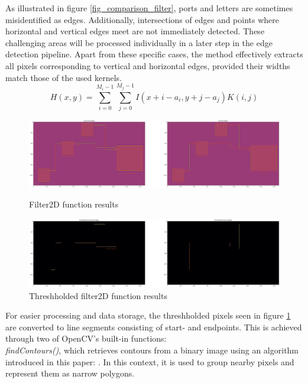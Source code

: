 As illustrated in figure \ref{fig_comparison_filter}, ports and letters are sometimes misidentified as edges. Additionally, intersections of edges and points where horizontal and vertical edges meet are not immediately detected. These challenging areas will be processed individually in a later step in the edge detection pipeline. Apart from these specific cases, the method effectively extracts all pixels corresponding to vertical and horizontal edges, provided their widths match those of the used kernels.
\begin{equation}
\label{eq_filter2D}
    H(x, y) = \sum_{i=0}^{M_i-1} \sum_{j=0}^{M_j-1} I(x + i - a_i,y + j - a_j)K(i, j)
\end{equation}

\newpage

\begin{figure}[htb]
    \centering
    \includegraphics[width=1\linewidth]{Pictures/filter2D.png}
    \caption{Filter2D function results}
    \label{fig_filter2d}

    \centering
    \includegraphics[width=1\linewidth]{Pictures/threshhold.png}
    \caption{Threshholded filter2D function results}
    \label{fig_threshhold}
\end{figure}
For easier processing and data storage, the threshholded pixels seen in figure \ref{fig_threshhold} are converted to line segments consisting of start- and endpoints. This is achieved through two of OpenCV's built-in functions:\\
\textit{findContours()}, which retrieves contours from a binary image using an algorithm introduced in this paper: \cite{art_findContours_algorithm}. In this context, it is used to group nearby pixels and represent them as narrow polygons.\\
